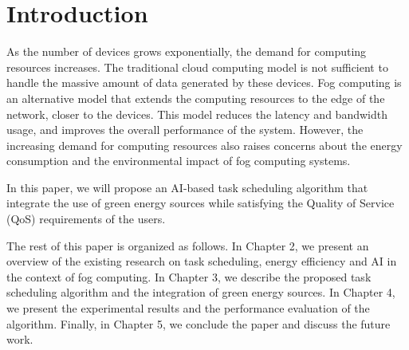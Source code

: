\chapter{Introduction}

As the number of devices grows exponentially, the demand for computing resources increases. The traditional cloud
computing model is not sufficient to handle the massive amount of data generated by these devices. Fog computing is an
alternative model that extends the computing resources to the edge of the network, closer to the devices. This model
reduces the latency and bandwidth usage, and improves the overall performance of the system. However, the increasing
demand for computing resources also raises concerns about the energy consumption and the environmental impact of fog
computing systems.

In this paper, we will propose an AI-based task scheduling algorithm that integrate the use of green energy sources
while satisfying the Quality of Service (QoS) requirements of the users.

The rest of this paper is organized as follows. In Chapter 2, we present an overview of the
existing research on task scheduling, energy efficiency and AI in the context of fog computing. In Chapter 3, we
describe the proposed task scheduling algorithm and the integration of green energy sources. In Chapter 4, we present
the experimental results and the performance evaluation of the algorithm. Finally, in Chapter 5, we conclude the paper
and discuss the future work.